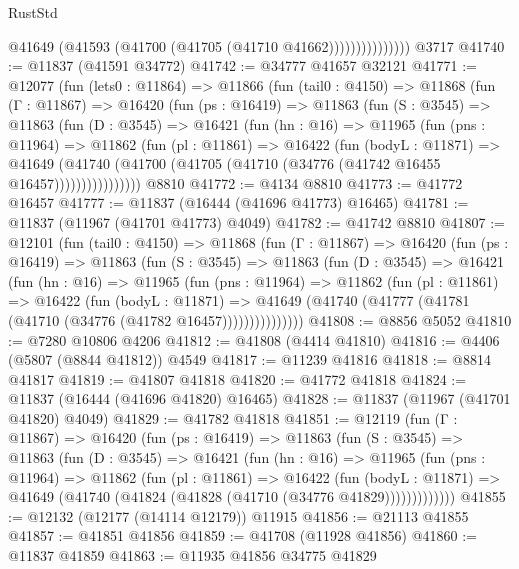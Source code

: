 \begin{lexlean}{RustStd}
\begin{coremodule}
{\begin{coremodule}
{{{{{{{{{{{{{{{{{{{{{{{{{{{{{{{{{{{{{{{{{{{{{{{{{{                        @41649 (@41593 (@41700 (@41705 (@41710 @41662)))))))))))))))
    @3717
@41740 := @11837 (@41591 @34772)
@41742 := @34777 @41657 @32121
@41771 := @12077
    (fun (lets0 : @11864) =>
    @11866
      (fun (tail0 : @4150) =>
      @11868
        (fun (Γ : @11867) =>
        @16420
          (fun (ps : @16419) =>
          @11863
            (fun (S : @3545) =>
            @11863
              (fun (D : @3545) =>
              @16421
                (fun (hn : @16) =>
                @11965
                  (fun (pns : @11964) =>
                  @11862
                    (fun (pl : @11861) =>
                    @16422
                      (fun (bodyL : @11871) =>
                      @41649
                        (@41740
                          (@41700 (@41705 (@41710 (@34776 (@41742 @16455 @16457))))))))))))))))
    @8810
@41772 := @4134 @8810
@41773 := @41772 @16457
@41777 := @11837 (@16444 (@41696 @41773) @16465)
@41781 := @11837 (@11967 (@41701 @41773) @4049)
@41782 := @41742 @8810
@41807 := @12101
    (fun (tail0 : @4150) =>
    @11868
      (fun (Γ : @11867) =>
      @16420
        (fun (ps : @16419) =>
        @11863
          (fun (S : @3545) =>
          @11863
            (fun (D : @3545) =>
            @16421
              (fun (hn : @16) =>
              @11965
                (fun (pns : @11964) =>
                @11862
                  (fun (pl : @11861) =>
                  @16422
                    (fun (bodyL : @11871) =>
                    @41649 (@41740 (@41777 (@41781 (@41710 (@34776 (@41782 @16457)))))))))))))))
@41808 := @8856 @5052
@41810 := @7280 @10806 @4206
@41812 := @41808 (@4414 @41810)
@41816 := @4406 (@5807 (@8844 @41812)) @4549
@41817 := @11239 @41816
@41818 := @8814 @41817
@41819 := @41807 @41818
@41820 := @41772 @41818
@41824 := @11837 (@16444 (@41696 @41820) @16465)
@41828 := @11837 (@11967 (@41701 @41820) @4049)
@41829 := @41782 @41818
@41851 := @12119
    (fun (Γ : @11867) =>
    @16420
      (fun (ps : @16419) =>
      @11863
        (fun (S : @3545) =>
        @11863
          (fun (D : @3545) =>
          @16421
            (fun (hn : @16) =>
            @11965
              (fun (pns : @11964) =>
              @11862
                (fun (pl : @11861) =>
                @16422
                  (fun (bodyL : @11871) =>
                  @41649 (@41740 (@41824 (@41828 (@41710 (@34776 @41829)))))))))))))
@41855 := @12132 (@12177 (@14114 @12179)) @11915
@41856 := @21113 @41855
@41857 := @41851 @41856
@41859 := @41708 (@11928 @41856)
@41860 := @11837 @41859
@41863 := @11935 @41856 @34775 @41829
}}}}}}}}}}}}}}}}}}}}}}}}}}}}}}}}}}}}}}}}}}}}}}}}}}
\end{coremodule}}
\end{coremodule}
\end{lexlean}
